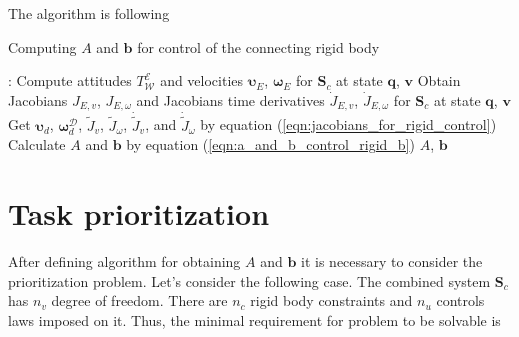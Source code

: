 The algorithm is following 

\begin{algorithm}
    \caption{Computing $A$ and $\mathbf{b}$ for control of the connecting 
    rigid body}

    \begin{algorithmic}[1]
         : 
        \State Compute attitudes $T_{\mathcal{W}}^{\mathcal{E}}$ and 
        velocities $\boldsymbol{\upsilon}_E$, $\boldsymbol{\omega}_E$ 
        for $\mathbf{S}_c$ at state $\mathbf{q}$, $\mathbf{v}$
        \State Obtain Jacobians $J_{E,v}$, $J_{E, \omega}$ and 
        Jacobians time derivatives $\dot{J}_{E,v}$, $\dot{J}_{E, \omega}$ 
        for $\mathbf{S}_c$ at state $\mathbf{q}$, $\mathbf{v}$
        \State Get $\boldsymbol{\upsilon}_d$, $\boldsymbol{\omega}_d^{\mathcal{D}}$, 
        $\tilde{J}_v$, $\tilde{J}_{\omega}$, $\dot{\tilde{J}}_v$, and 
        $\dot{\tilde{J}}_{\omega}$ by equation 
        (\ref{eqn:jacobians_for_rigid_control})
        \State Calculate $A$ and $\mathbf{b}$ by equation 
        (\ref{eqn:a_and_b_control_rigid_b})
        \State \Return $A$, $\mathbf{b}$
        \EndFunction
    \end{algorithmic}
    \label{alg:get_a_and_b_control_rigid}
\end{algorithm}


\section{Task prioritization}
\label{sec:task_prioritization}

After defining algorithm for obtaining $A$ and $\mathbf{b}$ it is necessary to 
consider the prioritization problem. Let's consider the following case. The 
combined system $\mathbf{S}_c$ has $n_v$ degree of freedom. There are $n_c$ 
rigid body constraints and $n_u$ controls laws imposed on it. Thus, the minimal 
requirement for problem to be solvable is

